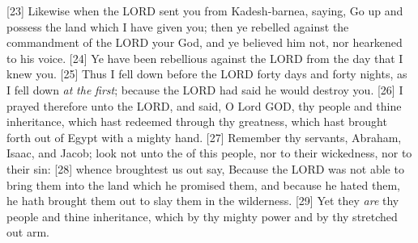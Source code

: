 [23] \textcolor[cmyk]{0.99998,1,0,0}{Likewise when the LORD sent you from Kadesh-barnea, saying, Go up and possess the land which I have given you; then ye rebelled against the commandment of the LORD your God, and ye believed him not, nor hearkened to his voice.}
[24] \textcolor[cmyk]{0.99998,1,0,0}{Ye have been rebellious against the LORD from the day that I knew you.}
[25] \textcolor[cmyk]{0.99998,1,0,0}{Thus I fell down before the LORD forty days and forty nights, as I fell down \emph{at} \emph{the} \emph{first}; because the LORD had said he would destroy you.}
[26] \textcolor[cmyk]{0.99998,1,0,0}{I prayed therefore unto the LORD, and said, O Lord GOD,   thy people and thine inheritance, which  hast redeemed through thy greatness, which  hast brought forth out of Egypt with a mighty hand.}
[27] \textcolor[cmyk]{0.99998,1,0,0}{Remember thy servants, Abraham, Isaac, and Jacob; look not unto the  of this people, nor to their wickedness, nor to their sin:}
[28] \textcolor[cmyk]{0.99998,1,0,0}{ whence  broughtest us out say, Because the LORD was not able to bring them into the land which he promised them, and because he hated them, he hath brought them out to slay them in the wilderness.}
[29] \textcolor[cmyk]{0.99998,1,0,0}{Yet they \emph{are} thy people and thine inheritance, which  by thy mighty power and by thy stretched out arm.}